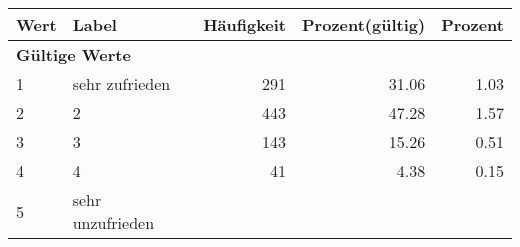      \begin{longtable}{lXrrr}
     \toprule
     \textbf{Wert} & \textbf{Label} & \textbf{Häufigkeit} & \textbf{Prozent(gültig)} & \textbf{Prozent} \\
     \endhead
     \midrule
     \multicolumn{5}{l}{\textbf{Gültige Werte}}\\

     1 &
     \multicolumn{1}{X}{ sehr zufrieden   } &


       \num{291} &
       \num[round-mode=places,round-precision=2]{31,06} &
         \num[round-mode=places,round-precision=2]{1,03} \\

     2 &
     \multicolumn{1}{X}{ 2   } &


       \num{443} &
       \num[round-mode=places,round-precision=2]{47,28} &
         \num[round-mode=places,round-precision=2]{1,57} \\

     3 &
     \multicolumn{1}{X}{ 3   } &


       \num{143} &
       \num[round-mode=places,round-precision=2]{15,26} &
         \num[round-mode=places,round-precision=2]{0,51} \\

     4 &
     \multicolumn{1}{X}{ 4   } &


       \num{41} &
       \num[round-mode=places,round-precision=2]{4,38} &
         \num[round-mode=places,round-precision=2]{0,15} \\

     5 &
     \multicolumn{1}{X}{ sehr unzufrieden   } &



\end{longtable}
